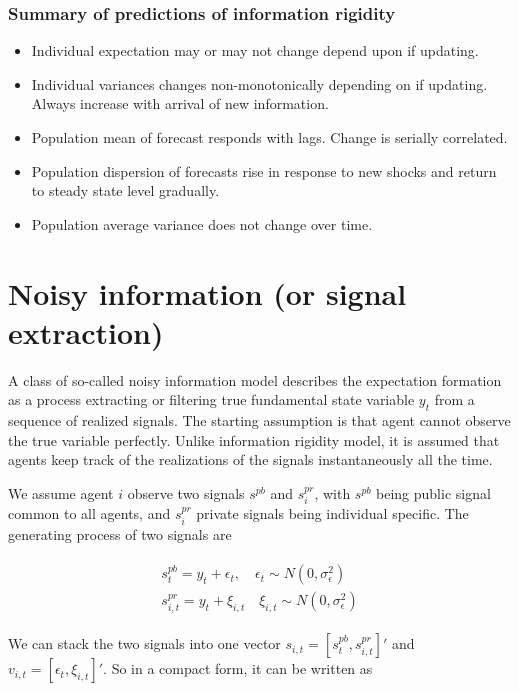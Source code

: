 \documentclass[]{article}
\begin{document}
\subsubsection{Summary of predictions of information rigidity}

\begin{itemize}
\item Individual expectation may or may not change depend upon if updating. 
\item Individual variances changes non-monotonically depending on if updating. Always increase with arrival of new information. 
\item Population mean of forecast responds with lags. Change is serially correlated. 
\item Population dispersion of forecasts rise in response to new shocks and return to steady state level gradually. 
\item Population average variance does not change over time. 
\end{itemize}

\section{Noisy information (or signal extraction)}

A class of so-called noisy information model describes the expectation formation as a process extracting or filtering true fundamental state variable $y_t$ from a sequence of realized signals. The starting assumption is that agent cannot observe the true variable perfectly. Unlike information rigidity model, it is assumed that agents keep track of the realizations of the signals instantaneously all the time. 

We assume agent $i$ observe two signals $s^{pb}$ and $s^{pr}_i$, with $s^{pb}$ being public signal common to all agents, and $s^{pr}_i$ private signals being individual specific. The generating process of two signals are 

\begin{eqnarray}
\begin{aligned}
s^{pb}_t = y_t + \epsilon_t, \quad \epsilon_t \sim N(0,\sigma^2_\epsilon)\\ 
s^{pr}_{i,t} = y_t + \xi_{i,t} \quad \xi_{i,t} \sim N(0,\sigma^2_\epsilon)
\end{aligned}
\end{eqnarray}

We can stack the two signals into one vector $s_{i,t} = [s^{pb}_t,s^{pr}_{i,t}]'$ and $v_{i,t}= [\epsilon_t,\xi_{i,t}]'$. So in a compact form, it can be written as
\end{document}
